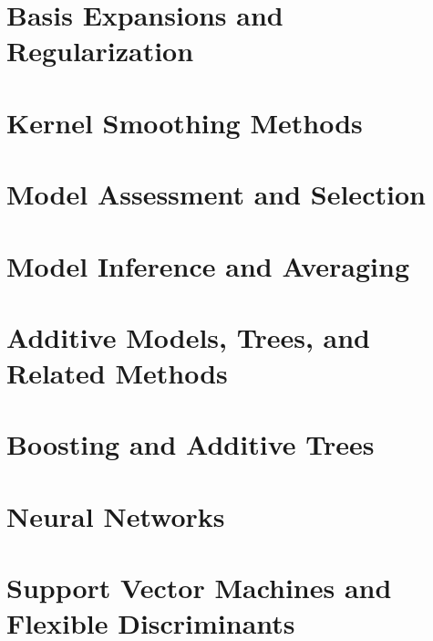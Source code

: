 \documentclass[a4paper,12pt,titlepage]{article} %
\begin{document}
\newpage
\section{Basis Expansions and Regularization}


\newpage
\section{Kernel Smoothing Methods}


\newpage
\section{Model Assessment and Selection}


\newpage
\section{Model Inference and Averaging}


\newpage
\section{Additive Models, Trees, and Related Methods}


\newpage
\section{Boosting and Additive Trees}


\newpage
\section{Neural Networks}


\newpage
\section{Support Vector Machines and Flexible Discriminants}


\newpage
\end{document}
